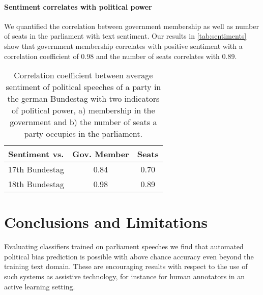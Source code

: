 \documentclass[11pt]{article}
\begin{document}
\paragraph{Sentiment correlates with political power} 
We quantified the correlation between government membership as well as number of seats in the parliament with text sentiment. Our results in  \autoref{tab:sentiments} show that government membership correlates with positive sentiment with a correlation coefficient of 0.98 and the number of seats correlates with 0.89.

\begin{table}[t]
\caption{
\label{tab:sentiments}
Correlation coefficient between average sentiment of political speeches of a party in the german Bundestag with two indicators of political power, a) membership in the government and b) the number of seats a party occupies in the parliament.
}
\begin{center}
\begin{tabular}{lcc}
   Sentiment vs. &          Gov. Member    &  Seats\\
\hline\hline
17th Bundestag    &  0.84 & 0.70\\
18th Bundestag   &  0.98 & 0.89\\
%
\end{tabular}
\end{center}
\end{table}


%

\section{Conclusions and Limitations}\label{sec:conclusion}
Evaluating classifiers trained on parliament speeches we find that automated political bias prediction is possible with above chance accuracy even beyond the training text domain. These are encouraging results with respect to the use of such systems as assistive technology, for instance for human annotators in an active learning setting. 
\end{document}
